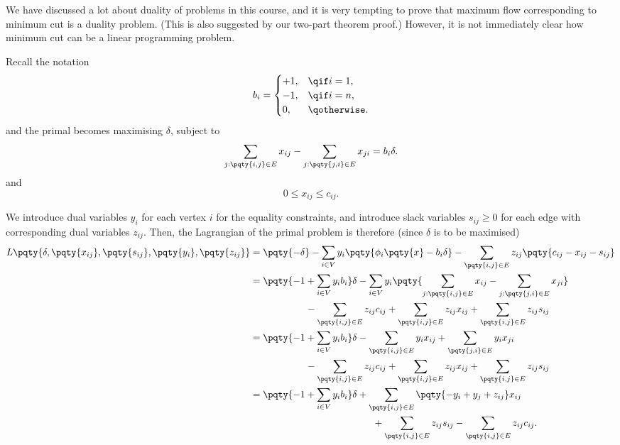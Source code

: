We have discussed a lot about duality of problems in this course, and it is very tempting to prove that maximum flow corresponding to minimum cut is a duality problem. (This is also suggested by our two-part theorem proof.) However, it is not immediately clear how minimum cut can be a linear programming problem.

Recall the notation
\[
    b_i = \begin{cases}
        +1, &\qif i = 1, \\
        -1, &\qif i = n, \\
        0, &\qotherwise.
    \end{cases}
\]
and the primal becomes maximising \(\delta\), subject to
\[
    \sum_{j: \pqty{i, j} \in E} x_{ij} - \sum_{j: \pqty{j, i} \in E} x_{ji} = b_i \delta.
\]
and
\[
    0 \leq x_{ij} \leq c_{ij}.
\]

We introduce dual variables \(y_i\) for each vertex \(i\) for the equality constraints, and introduce slack variables \(s_{ij} \geq 0\) for each edge with corresponding dual variables \(z_{ij}\). Then, the Lagrangian of the primal problem is therefore (since \(\delta\) is to be maximised)
\begin{align*}
    L\pqty{\delta, \pqty{x_{ij}}, \pqty{s_{ij}}, \pqty{y_i}, \pqty{z_{ij}}} &= \pqty{-\delta} - \sum_{i \in V} y_i \pqty{\phi_i \pqty{x} - b_i \delta} - \sum_{\pqty{i, j} \in E} z_{ij} \pqty{c_{ij} - x_{ij} - s_{ij}} \\
    &= \pqty{-1 + \sum_{i \in V} y_i b_i} \delta - \sum_{i \in V} y_i \pqty{\sum_{j: \pqty{i, j} \in E} x_{ij} - \sum_{j: \pqty{j, i} \in E} x_{ji}} \\
    &\phantom{=} \hspace{5em} - \sum_{\pqty{i, j} \in E} z_{ij} c_{ij} + \sum_{\pqty{i, j} \in E} z_{ij} x_{ij} + \sum_{\pqty{i, j} \in E} z_{ij} s_{ij} \\
    &= \pqty{-1 + \sum_{i \in V} y_i b_i} \delta - \sum_{\pqty{i, j} \in E} y_i x_{ij} + \sum_{\pqty{j, i} \in E} y_i x_{ji} \\
    &\phantom{=} \hspace{5em} - \sum_{\pqty{i, j} \in E} z_{ij} c_{ij} + \sum_{\pqty{i, j} \in E} z_{ij} x_{ij} + \sum_{\pqty{i, j} \in E} z_{ij} s_{ij} \\
    &=  \pqty{-1 + \sum_{i \in V} y_i b_i} \delta + \sum_{\pqty{i, j} \in E} \pqty{- y_i + y_j + z_{ij}} x_{ij} \\
    &\phantom{=} \hspace{12em} + \sum_{\pqty{i, j} \in E} z_{ij} s_{ij} - \sum_{\pqty{i, j} \in E} z_{ij} c_{ij}.
\end{align*}


